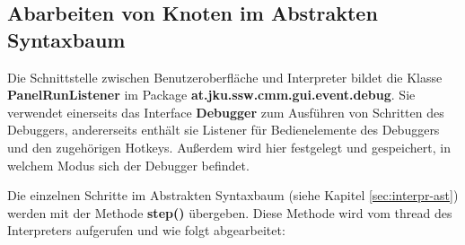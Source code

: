 
\subsection{Abarbeiten von Knoten im Abstrakten Syntaxbaum}
Die Schnittstelle zwischen Benutzeroberfläche und Interpreter bildet die Klasse \textbf{PanelRunListener} im Package \textbf{at.jku.ssw.cmm.gui.event.debug}. Sie verwendet einerseits das Interface \textbf{Debugger} zum Ausführen von Schritten des Debuggers, andererseits enthält sie Listener für Bedienelemente des Debuggers und den zugehörigen Hotkeys. Außerdem wird hier festgelegt und gespeichert, in welchem Modus sich der Debugger befindet.

Die einzelnen Schritte im Abstrakten Syntaxbaum (siehe Kapitel \ref{sec:interpr-ast}) werden mit der Methode \textbf{step()} übergeben. Diese Methode wird vom thread des Interpreters aufgerufen und wie folgt abgearbeitet:

